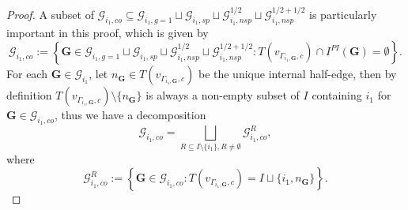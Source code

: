 \documentclass[11pt]{amsart}
\theoremstyle{definition}
\theoremstyle{remark}
\newcommand{\<}{\left<}
\renewcommand{\>}{\right>}
\numberwithin{equation}{section}
\begin{document}
\begin{proof}
        A subset of $\bm{\mathcal G}_{i_1,co}\subseteq \bm{\mathcal G}^{}_{i_1,g=1} \sqcup \bm{\mathcal G}^{}_{i_1,sp} \sqcup \bm{\mathcal G}^{1/2}_{i_1,nsp} \sqcup \bm{\mathcal G}^{1/2+1/2}_{i_1,nsp}$ is particularly important in this proof, which is given %
by
        \begin{equation*}
            \bm{\mathcal G}_{i_1,co}:=\left\{ \bm{G}\in \bm{\mathcal G}^{}_{i_1,g=1} \sqcup \bm{\mathcal G}^{}_{i_1,sp} \sqcup \bm{\mathcal G}^{1/2}_{i_1,nsp} \sqcup \bm{\mathcal G}^{1/2+1/2}_{i_1,nsp}\colon T(v_{\Gamma_{i_1,\bm{G}},c})\cap I^{PI}(\bm{G})=\emptyset \right\}.
        \end{equation*}
        For %
each $\bm{G}\in \bm{\mathcal G}_{i_1}$, let $n_{\bm{G}}\in T(v_{\Gamma_{i_1,\bm{G}},c})$ be the unique internal half-edge, then by definition $T(v_{\Gamma_{i_1,\bm{G}},c})\setminus\{n_{\bm{G}}\}$ is always a non-empty subset of $I$ containing $i_1$ for $\bm{G}\in \bm{\mathcal G}_{i_1,co}$, thus we have a decomposition 
        \begin{equation*}
            \bm{\mathcal G}_{i_1,co}= \bigsqcup_{R\subseteq I\setminus \{i_1\}, R\ne \emptyset}\bm{\mathcal G}^R_{i_1,co},
        \end{equation*}
        where 
        \begin{equation*}
            \bm{\mathcal G}^R_{i_1,co}:= \left\{ \bm{G}\in \bm{\mathcal G}_{i_1,co} \colon  T(v_{\Gamma_{i_1,\bm{G}},c})=I\sqcup \{i_1,n_{\bm{G}}\}\right\}.
        \end{equation*}
        
        
        


\end{proof}
\end{document}
